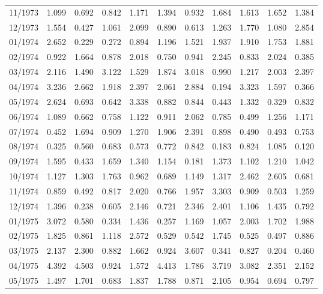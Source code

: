\begin{tabular}{lrrrrrrrrrr}
11/1973 &  1.099 &  0.692 &  0.842 &  1.171 &  1.394 &  0.932 &  1.684 &  1.613 &  1.652 &  1.384 \\
12/1973 &  1.554 &  0.427 &  1.061 &  2.099 &  0.890 &  0.613 &  1.263 &  1.770 &  1.080 &  2.854 \\
01/1974 &  2.652 &  0.229 &  0.272 &  0.894 &  1.196 &  1.521 &  1.937 &  1.910 &  1.753 &  1.881 \\
02/1974 &  0.922 &  1.664 &  0.878 &  2.018 &  0.750 &  0.941 &  2.245 &  0.833 &  2.024 &  0.385 \\
03/1974 &  2.116 &  1.490 &  3.122 &  1.529 &  1.874 &  3.018 &  0.990 &  1.217 &  2.003 &  2.397 \\
04/1974 &  3.236 &  2.662 &  1.918 &  2.397 &  2.061 &  2.884 &  0.194 &  3.323 &  1.597 &  0.366 \\
05/1974 &  2.624 &  0.693 &  0.642 &  3.338 &  0.882 &  0.844 &  0.443 &  1.332 &  0.329 &  0.832 \\
06/1974 &  1.089 &  0.662 &  0.758 &  1.122 &  0.911 &  2.062 &  0.785 &  0.499 &  1.256 &  1.171 \\
07/1974 &  0.452 &  1.694 &  0.909 &  1.270 &  1.906 &  2.391 &  0.898 &  0.490 &  0.493 &  0.753 \\
08/1974 &  0.325 &  0.560 &  0.683 &  0.573 &  0.772 &  0.842 &  0.183 &  0.824 &  1.085 &  0.120 \\
09/1974 &  1.595 &  0.433 &  1.659 &  1.340 &  1.154 &  0.181 &  1.373 &  1.102 &  1.210 &  1.042 \\
10/1974 &  1.127 &  1.303 &  1.763 &  0.962 &  0.689 &  1.149 &  1.317 &  2.462 &  2.605 &  0.681 \\
11/1974 &  0.859 &  0.492 &  0.817 &  2.020 &  0.766 &  1.957 &  3.303 &  0.909 &  0.503 &  1.259 \\
12/1974 &  1.396 &  0.238 &  0.605 &  2.146 &  0.721 &  2.346 &  2.401 &  1.106 &  1.435 &  0.792 \\
01/1975 &  3.072 &  0.580 &  0.334 &  1.436 &  0.257 &  1.169 &  1.057 &  2.003 &  1.702 &  1.988 \\
02/1975 &  1.825 &  0.861 &  1.118 &  2.572 &  0.529 &  0.542 &  1.745 &  0.525 &  0.497 &  0.886 \\
03/1975 &  2.137 &  2.300 &  0.882 &  1.662 &  0.924 &  3.607 &  0.341 &  0.827 &  0.204 &  0.460 \\
04/1975 &  4.392 &  4.503 &  0.924 &  1.572 &  4.413 &  1.786 &  3.719 &  3.082 &  2.351 &  2.152 \\
05/1975 &  1.497 &  1.701 &  0.683 &  1.837 &  1.788 &  0.871 &  2.105 &  0.954 &  0.694 &  0.797 \\

\end{tabular}
